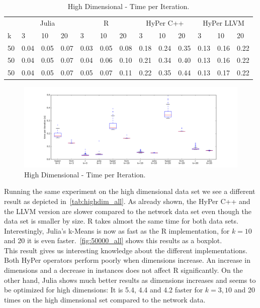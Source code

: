\begin{table}[htsb]
  \caption[High Dimensional - Time per Iteration]{High Dimensional - Time per Iteration.}
  \label{tab:highdim_all}
  \centering
  \begin{tabular}{l l l l l l l l l l l l l}
    \toprule
      & \multicolumn{3}{c}{Julia} & \multicolumn{3}{c}{R} & \multicolumn{3}{c}{HyPer C++} & \multicolumn{3}{c}{HyPer LLVM}  \\
      k & 3 & 10 & 20 & 3 & 10 & 20 & 3 & 10 & 20 & 3 & 10 & 20 \\
    \midrule
      50  & 0.04 & 0.05 & 0.07 & 0.03 & 0.05 & 0.08 & 0.18 & 0.24 & 0.35 & 0.13 & 0.16 & 0.22 \\
      50  & 0.04 & 0.05 & 0.07 & 0.04 & 0.06 & 0.10 & 0.21 & 0.34 & 0.40 & 0.13 & 0.16 & 0.22 \\
      50  & 0.04 & 0.05 & 0.07 & 0.05 & 0.07 & 0.11 & 0.22 & 0.35 & 0.44 & 0.13 & 0.17 & 0.22 \\
    \bottomrule
  \end{tabular}
\end{table}

\begin{figure}[htsb]
  \raggedleft
  \includegraphics[scale=0.4, trim="0cm 1cm 0cm 0cm"]{figures/charts/50000_all}
  \caption[High Dimensional - Time per Iteration]{High Dimensional - Time per Iteration.}
  \label{fig:50000_all}
\end{figure}



Running the same experiment on the high dimensional data set we see a different result as depicted in~\autoref{tab:highdim_all}. As already shown, the HyPer C++ and the LLVM version are slower compared to the network data set even though the data set is smaller by size. R takes almost the same time for both data sets. Interestingly, Julia’s k-Means is now as fast as the R implementation, for $k = 10$ and 20 it is even faster.~\autoref{fig:50000_all} shows this results as a boxplot. 
\\
This result gives us interesting knowledge about the different implementations. Both HyPer operators perform poorly when dimensions increase. An increase in dimensions and a decrease in instances does not affect R significantly. On the other hand, Julia shows much better results as dimensions increases and seems to be optimized for high dimensions: It is 5.4, 4.4 and 4.2 faster for $k = 3, 10$ and 20 times on the high dimensional set compared to the network data. 

